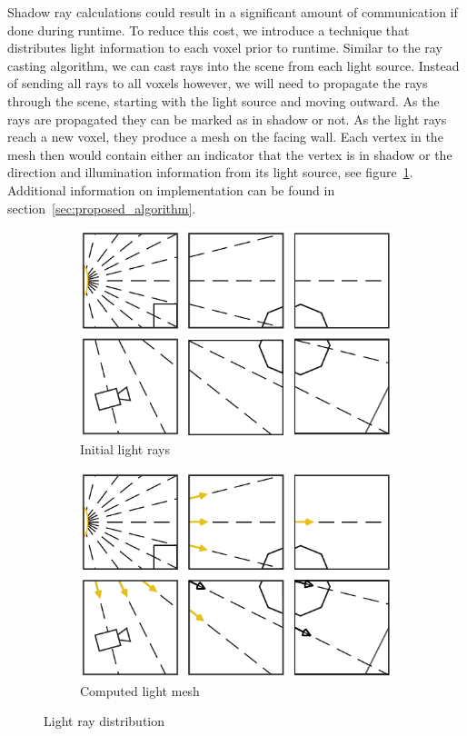 Shadow ray calculations could result in a significant amount of communication if
done during runtime.  To reduce this cost, we introduce a technique that 
distributes light information to each voxel prior to runtime.  Similar to the 
ray casting algorithm, we can cast rays into the scene from each light source.  
Instead of sending all rays to all voxels however, we will need to propagate the
rays through the scene, starting with the light source and moving outward.  As
the rays are propagated they can be marked as in shadow or not.  As the light
rays reach a new voxel, they produce a mesh on the facing wall.  Each vertex in
the mesh then would contain either an indicator that the vertex is in shadow or
the direction and illumination information from its light source, see 
figure~\ref{fig:light-distribution}.  Additional information on 
implementation can be found in section~\ref{sec:proposed_algorithm}.

\begin{figure}[!htb]
\centering
\begin{subfigure}{0.49\textwidth}
 \centering
  \includegraphics[width=.98\columnwidth]{drawings/Lights1.pdf}
  \caption{Initial light rays}
\end{subfigure}
\begin{subfigure}{0.49\textwidth}
 \centering
  \includegraphics[width=.98\columnwidth]{drawings/Lights2.pdf}
  \caption{Computed light mesh}
\end{subfigure}
\caption{Light ray distribution}
\label{fig:light-distribution}
\end{figure}

